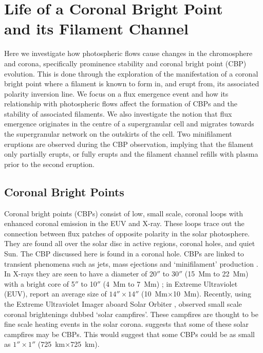 \chapter{Life of a Coronal Bright Point\\ and its Filament Channel}\label{Chap:cbps}


Here we investigate how photospheric flows cause changes in the chromosphere and corona, specifically prominence stability and coronal bright point (CBP) evolution. This is done through the exploration of the manifestation of a coronal bright point where a filament is known to form in, and erupt from, its associated polarity inversion line. We focus on a flux emergence event and how its relationship with photospheric flows affect the formation of CBPs and the stability of associated filaments. We also investigate the notion that flux emergence originates in the centre of a supergranular cell and migrates towards the supergranular network on the outskirts of the cell. Two minifilament eruptions are observed during the CBP observation, implying that the filament only partially erupts, or fully erupts and the filament channel refills with plasma prior to the second eruption. 

\section{Coronal Bright Points}
\label{cbp}
Coronal bright points (CBPs) consist of low, small scale, coronal loops with enhanced coronal emission in the EUV and X-ray. These loops trace out the connection between flux patches of opposite polarity in the solar photosphere. They are found all over the solar disc in active regions, coronal holes, and quiet Sun. The CBP discussed here is found in a coronal hole. CBPs are linked to transient phenomena such as jets, mass ejections and `minifilament' production \citep{sterling_small-scale_2015,sterling_minifilament_2016}. In X-rays they are seen to have a diameter of 20$''$ to 30$''$ (15~Mm to 22~Mm) with a bright core of 5$''$ to 10$''$ (4~Mm to 7~Mm) \citep{madjarska_coronal_2019}; in Extreme Ultraviolet (EUV), \cite{zhang_spatial_2001} report an average size of $14''\times14''$ (10~Mm$\times$10~Mm). Recently, using the Extreme Ultraviolet Imager \citep[EUI;][]{rochus_solar_2020} aboard Solar Orbiter \citep[SolO; ][]{muller_solar_2020}, \cite{berghmans_extreme-uv_2021} observed small scale coronal brightenings dubbed `solar campfires'. These campfires are thought to be fine scale heating events in the solar corona. \cite{panesar_magnetic_2021} suggests that some of these solar campfires may be CBPs. This would suggest that some CBPs could be as small as $1''\times1''$ (725~km$\times$725~km).


